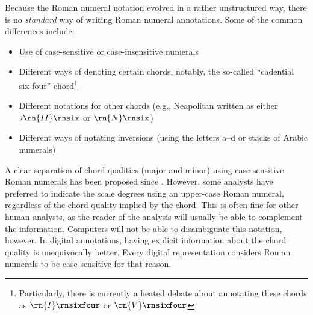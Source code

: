

Because the Roman numeral notation evolved in a rather
unstructured way, there is no \emph{standard} way of writing
Roman numeral annotations. 
Some of the common differences include:

\begin{itemize}
    \item Use of case-sensitive or case-insensitive numerals
    \item Different ways of denoting certain chords,
    notably, the so-called ``cadential six-four''
    chord\footnote{Particularly, there is currently a heated
    debate about annotating these chords as
    $\rn{I}\rnsixfour$ or $\rn{V}\rnsixfour$}
    \item Different notations for other chords (e.g.,
    Neapolitan written as either $\flat\rn{II}\rnsix$ or
    $\rn{N}\rnsix$)
    \item Different ways of notating inversions (using the
    letters a--d or stacks of Arabic numerals)
\end{itemize}

A clear separation of chord qualities (major and minor)
using case-sensitive Roman numerals has been proposed since
\textcite{weber1817versuch}. However, some analysts have
preferred to indicate the scale degrees using an upper-case
Roman numeral, regardless of the chord quality implied by
the chord. This is often fine for other human analysts, as
the reader of the analysis will usually be able to
complement the information. Computers will not be able to
disambiguate this notation, however. In digital annotations,
having explicit information about the chord quality is
unequivocally better. Every digital representation considers
Roman numerals to be case-sensitive for that reason.


